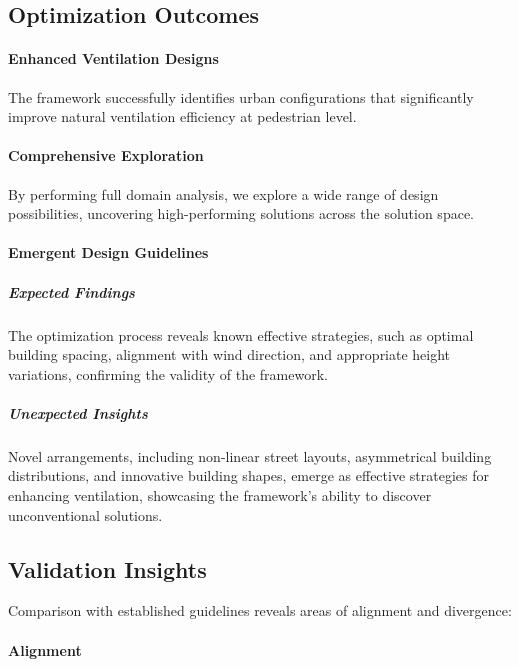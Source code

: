 \documentclass[times,final]{elsarticle}
\begin{document}
\subsection{Optimization Outcomes}


\paragraph{Enhanced Ventilation Designs}

The framework successfully identifies urban configurations that
significantly improve natural ventilation efficiency at pedestrian
level.


\paragraph{Comprehensive Exploration}

By performing full domain analysis, we explore a wide range of design
possibilities, uncovering high-performing solutions across the solution
space.

\paragraph{Emergent Design Guidelines}


\subparagraph{Expected Findings}

The optimization process reveals known effective strategies, such as
optimal building spacing, alignment with wind direction, and appropriate
height variations, confirming the validity of the framework.


\subparagraph{Unexpected Insights}

Novel arrangements, including non-linear street layouts, asymmetrical
building distributions, and innovative building shapes, emerge as
effective strategies for enhancing ventilation, showcasing the
framework's ability to discover unconventional solutions.


\subsection{Validation Insights}

Comparison with established guidelines reveals areas of alignment and
divergence:


\paragraph{Alignment}
\end{document}
